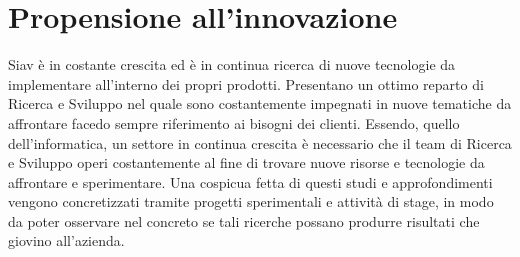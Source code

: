 \section{Propensione all'innovazione}
Siav è in costante crescita ed è in continua ricerca di nuove tecnologie da implementare all'interno dei propri prodotti. Presentano un ottimo reparto di Ricerca e Sviluppo nel quale sono costantemente impegnati in nuove tematiche da affrontare facedo sempre riferimento ai bisogni dei clienti. Essendo, quello dell'informatica, un settore in continua crescita è necessario che il team di Ricerca e Sviluppo operi costantemente al fine di trovare nuove risorse e tecnologie da affrontare e sperimentare. Una cospicua fetta di questi studi e approfondimenti vengono concretizzati tramite progetti sperimentali e attività di stage, in modo da poter osservare nel concreto se tali ricerche possano produrre risultati che giovino all'azienda. 